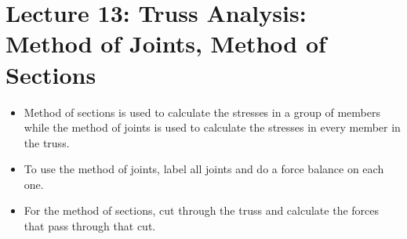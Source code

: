 \section{Lecture 13: Truss Analysis: Method of Joints, Method of Sections}
\begin{itemize}
    \item Method of sections is used to calculate the stresses in a group of members while the method of joints is used to calculate the stresses in every member in the truss.
    \item To use the method of joints, label all joints and do a force balance on each one.
    \item For the method of sections, cut through the truss and calculate the forces that pass through that cut.
\end{itemize}